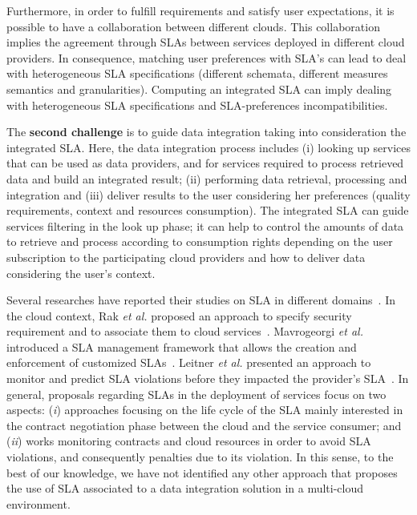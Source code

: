 \documentclass[11pt,a4paper,oneside]{report}
\begin{document}
Furthermore, in order to fulfill requirements and satisfy user expectations, it is possible to have a collaboration between different clouds. This collaboration implies the agreement through SLAs between services deployed in different cloud providers. In consequence, matching user preferences with SLA's can lead to deal with heterogeneous SLA specifications (different schemata, different measures semantics and granularities). Computing an integrated SLA can imply dealing with heterogeneous SLA specifications and SLA-preferences incompatibilities.

The \textbf{second challenge} is to guide data integration taking into consideration the integrated SLA. Here, the data integration process includes (i) looking up services that can be used as data providers, and for services required to process retrieved data and build an integrated result; (ii) performing data retrieval, processing and integration and (iii) deliver results to the user considering her preferences (quality requirements, context and resources consumption). The integrated SLA can guide services filtering in the look up phase; it can help to control the amounts of data to retrieve and process according to consumption rights depending on the user subscription to the participating cloud providers and how to deliver data considering the user's context.


Several researches have reported their studies on SLA in different domains~\cite{AlhamadDC11}. In the cloud context, Rak \textit{et al.} proposed an approach to specify security requirement and to associate them to cloud services~\cite{rak2013}. Mavrogeorgi \textit{et al.} introduced a SLA management framework that allows the creation and enforcement of customized SLAs~\cite{Mavrogeorgi2013}. Leitner \textit{et al.} presented an approach to monitor and predict SLA violations before they impacted the provider's SLA~\cite{Leitner2010}. In general, proposals regarding SLAs in the deployment of services focus on two aspects: (\textit{i}) approaches focusing on the life cycle of the SLA mainly interested in the contract negotiation phase between the cloud and the service consumer; and (\textit{ii}) works monitoring contracts and cloud resources in order to avoid SLA violations, and consequently penalties due to its violation. In this sense, to the best of our knowledge, we have not identified any other approach that proposes the use of SLA associated to a data integration solution in a multi-cloud environment.
\end{document}
